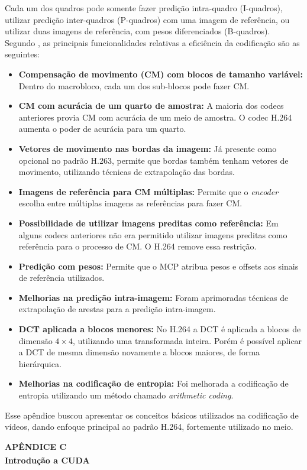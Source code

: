 \documentclass[cic,tc]{iiufrgs}
\newcommand{\reg}{\textsuperscript{\textregistered}}
\begin{document}
Cada um dos quadros pode somente fazer predição intra-quadro (I-quadros), utilizar 
predição inter-quadros (P-quadros) com uma imagem de referência, ou utilizar 
duas imagens de referência, com pesos diferenciados (B-quadros).
Segundo \citet{WiegangH264}, as principais funcionalidades relativas a eficiência
da codificação são as seguintes:
\begin{itemize}
    \item \textbf{Compensação de movimento (CM) com blocos de tamanho variável:}
    Dentro do macrobloco, cada um dos sub-blocos pode fazer CM.
    \item \textbf{CM com acurácia de um quarto de amostra:} A maioria dos codecs anteriores 
    provia CM com acurácia de um meio de amostra. O codec H.264 aumenta o poder 
    de acurácia para um quarto.
    \item \textbf{Vetores de movimento nas bordas da imagem:} Já presente como opcional
    no padrão H.263, permite que bordas também tenham vetores de movimento, utilizando
    técnicas de extrapolação das bordas.
    \item \textbf{Imagens de referência para CM múltiplas:} Permite que o \textit{encoder}
    escolha entre múltiplas imagens as referências para fazer CM.
    \item \textbf{Possibilidade de utilizar imagens preditas como referência:} Em alguns 
    codecs anteriores não era permitido utilizar imagens preditas como referência para o 
    processo de CM. O H.264 remove essa restrição.
    \item \textbf{Predição com pesos:} Permite que o MCP atribua pesos e offsets aos 
    sinais de referência utilizados.
    \item \textbf{Melhorias na predição intra-imagem:} Foram aprimoradas técnicas de
    extrapolação de arestas para a predição intra-imagem.
    \item \textbf{DCT aplicada a blocos menores:} No H.264 a DCT é aplicada a blocos de 
    dimensão $4\times4$, utilizando uma transformada inteira. Porém é possível aplicar 
    a DCT de mesma dimensão novamente a blocos maiores, de forma hierárquica.
    \item \textbf{Melhorias na codificação de entropia:} Foi melhorada a codificação de 
    entropia utilizando um método chamado \emph{arithmetic coding}.
\end{itemize}

Esse apêndice buscou apresentar os conceitos básicos utilizados na codificação de vídeos, 
dando enfoque principal ao padrão H.264, fortemente utilizado no meio.
\newpage
{
    \centering
    \textbf{APÊNDICE C} \\
    \textbf{Introdução a CUDA\reg} \par
}
\vspace{1em}
\end{document}
